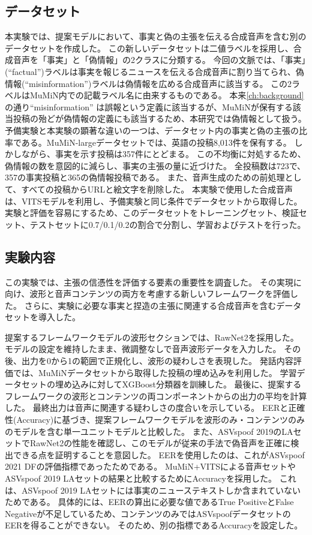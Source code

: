 \subsection{データセット}
本実験では、提案モデルにおいて、事実と偽の主張を伝える合成音声を含む別のデータセットを作成した。
この新しいデータセットは二値ラベルを採用し、合成音声を「事実」と「偽情報」の2クラスに分類する。
今回の文脈では、「事実」(``factual'')ラベルは事実を報じるニュースを伝える合成音声に割り当てられ、偽情報(``misinformation'')ラベルは偽情報を広める合成音声に該当する。
この2ラベルはMuMiN内での記載ラベル名に由来するものである。
本来\cref{ch:background}の通り``misinformation'' は誤報という定義に該当するが、MuMiNが保有する該当投稿の殆どが偽情報の定義にも該当するため、本研究では偽情報として扱う。
予備実験と本実験の顕著な違いの一つは、データセット内の事実と偽の主張の比率である。MuMiN-largeデータセットでは、英語の投稿8,013件を保有する。
しかしながら、事実を示す投稿は357件にとどまる。
この不均衡に対処するため、偽情報の数を意図的に減らし、事実の主張の量に近づけた。
全投稿数は723で、357の事実投稿と365の偽情報投稿である。
また、音声生成のための前処理として、すべての投稿からURLと絵文字を削除した。
本実験で使用した合成音声は、VITSモデルを利用し、予備実験と同じ条件でデータセットから取得した。
実験と評価を容易にするため、このデータセットをトレーニングセット、検証セット、テストセットに0.7/0.1/0.2の割合で分割し、学習およびテストを行った。

\subsection{実験内容}
この実験では、主張の信憑性を評価する要素の重要性を調査した。
その実現に向け、波形と音声コンテンツの両方を考慮する新しいフレームワークを評価した。
さらに、実験に必要な事実と捏造の主張に関連する合成音声を含むデータセットを導入した。

提案するフレームワークモデルの波形セクションでは、RawNet2を採用した。
モデルの設定を維持したまま、微調整なしで音声波形データを入力した。
その後、出力を0から1の範囲で正規化し、波形の疑わしさを表現した。
発話内容評価では、MuMiNデータセットから取得した投稿の埋め込みを利用した。
学習データセットの埋め込みに対してXGBoost分類器を訓練した。
最後に、提案するフレームワークの波形とコンテンツの両コンポーネントからの出力の平均を計算した。
最終出力は音声に関連する疑わしさの度合いを示している。
EERと正確性(Accuracy)に基づき、提案フレームワークモデルを波形のみ・コンテンツのみのモデルを含む単一ユニットモデルと比較した。 
また、ASVspoof 2019のLAセットでRawNet2の性能を確認し、このモデルが従来の手法で偽音声を正確に検出できる点を証明することを意図した。
EERを使用したのは、これがASVspoof 2021 DFの評価指標であったためである。
MuMiN+VITSによる音声セットやASVspoof 2019 LAセットの結果と比較するためにAccuracyを採用した。
これは、ASVspoof 2019 LAセットには事実のニューステキストしか含まれていないためである。
具体的には、EERの算出に必要な値であるTrue PositiveとFalse Negativeが不足しているため、コンテンツのみではASVspoofデータセットのEERを得ることができない。
そのため、別の指標であるAccuracyを設定した。

